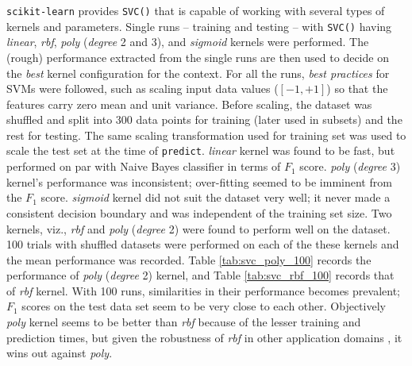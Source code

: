 \documentclass{article}
\begin{document}
	\texttt{scikit-learn} provides \texttt{SVC()} that is capable of working with several types of kernels and parameters. Single runs -- training and testing -- with \texttt{SVC()} having \emph{linear}, \emph{rbf}, \emph{poly} (\emph{degree} 2 and 3), and \emph{sigmoid} kernels were performed. The (rough) performance extracted from the single runs are then used to decide on the \emph{best} kernel configuration for the context. For all the runs, \emph{best practices} for SVMs \cite{hsu2003} were followed, such as scaling input data values ($[-1,+1]$) so that the features carry zero mean and unit variance. Before scaling, the dataset was shuffled and split into 300 data points for training (later used in subsets) and the rest for testing. The same scaling transformation used for training set was used to scale the test set at the time of \texttt{predict}. \emph{linear} kernel was found to be fast, but performed on par with Naive Bayes classifier in terms of $F_1$ score. \emph{poly} (\emph{degree} 3) kernel's performance was inconsistent; over-fitting seemed to be imminent from the $F_1$ score. \emph{sigmoid} kernel did not suit the dataset very well; it never made a consistent decision boundary and was independent of the training set size. Two kernels, viz., \emph{rbf} and \emph{poly} (\emph{degree} 2) were found to perform well on the dataset. 100 trials with shuffled datasets were performed on each of the these kernels and the mean performance was recorded. Table \ref{tab:svc_poly_100} records the performance of \emph{poly} (\emph{degree} 2) kernel, and Table \ref{tab:svc_rbf_100} records that of \emph{rbf} kernel. With 100 runs, similarities in their performance becomes prevalent; $F_1$ scores on the test data set seem to be very close to each other. Objectively \emph{poly} kernel seems to be better than \emph{rbf} because of the lesser training and prediction times, but given the robustness of \emph{rbf} in other application domains \cite{hsu2003}, it wins out against \emph{poly}.  
	
\end{document}
